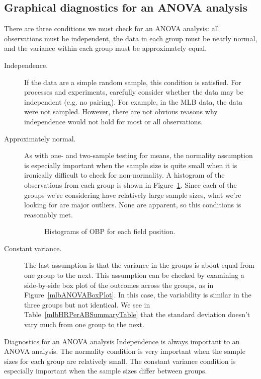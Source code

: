 \subsection{Graphical diagnostics for an ANOVA analysis}

There are three conditions we must check for an ANOVA analysis:
all observations must be independent,
the data in each group must be nearly normal,
and the variance within each group must be approximately equal.
\begin{description}
\item[Independence.]
    If the data are a simple random sample,
    this condition is satisfied.
    For processes and experiments, carefully consider whether
    the data may be independent (e.g. no pairing).
    For example, in the MLB data, the data were not sampled.
    However, there are not obvious reasons why independence
    would not hold for most or all observations.
\item[Approximately normal.]
    As with one- and two-sample testing for means,
    the normality assumption is especially important
    when the sample size is quite small when it is
    ironically difficult to check for non-normality.
    A histogram of the observations from each group
    is shown in Figure~\ref{mlbANOVADiagNormalityGroups}.
    Since each of the groups we're considering have
    relatively large sample sizes,
    what we're looking for are major outliers.
    None are apparent, so this conditions is reasonably met.
    \begin{figure}[h]
      \centering
      \caption{Histograms of OBP for each field position.}
      \label{mlbANOVADiagNormalityGroups}
    \end{figure}
\item[Constant variance.]
    The last assumption is that the variance in the
    groups is about equal from one group to the next.
    This assumption can be checked by examining a
    side-by-side box plot of the outcomes across the
    groups, as in Figure~\vref{mlbANOVABoxPlot}.
    In this case, the variability is similar in the
    three groups but not identical.
    We see in Table~\vref{mlbHRPerABSummaryTable}
    that the standard deviation doesn't vary much
    from one group to the next.
\end{description}


\begin{onebox}{Diagnostics for an ANOVA analysis}
  Independence is always important to an ANOVA analysis.
  The normality condition is very important when the sample
  sizes for each group are relatively small.
  The constant variance condition is especially important
  when the sample sizes differ between groups.
\end{onebox}


